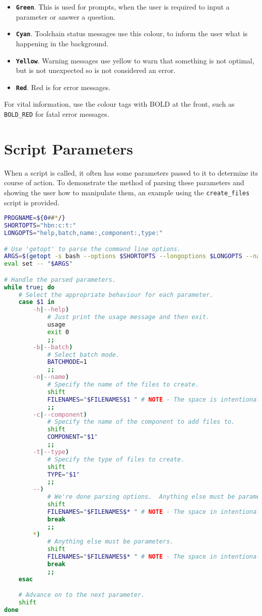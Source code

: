 \documentclass[a4paper, oneside, 11pt, titlepage, onecolumn, openright]{report}
\begin{document}
\begin{itemize}

\item \textbf{\texttt{Green}}. This is used for prompts, when the user is required to input a parameter or answer a question.

\item \textbf{\texttt{Cyan}}. Toolchain status messages use this colour, to inform the user what is happening in the background.

\item \textbf{\texttt{Yellow}}. Warning messages use yellow to warn that something is not optimal, but is not unexpected so is not considered an error.

\item \textbf{\texttt{Red}}. Red is for error messages.

\end{itemize}

			For vital information, use the colour tags with BOLD at the front, such as \texttt{BOLD\_RED} for fatal error messages.

\section{Script Parameters}
			\label{s:ScriptParameters}
			
			When a script is called, it often has some parameters passed to it to determine its course of action. To demonstrate the method of parsing these parameters and showing the user how to manipulate them, an example using the \texttt{create\_files} script is provided.
\begin{lstlisting}[frame=trBL, breaklines=true, language = bash]
PROGNAME=${0##*/} 
SHORTOPTS="hbn:c:t:"
LONGOPTS="help,batch,name:,component:,type:"

# Use 'getopt' to parse the command line options.
ARGS=$(getopt -s bash --options $SHORTOPTS --longoptions $LONGOPTS --name $PROGNAME -- "$@")
eval set -- "$ARGS"

# Handle the parsed parameters.
while true; do
	# Select the appropriate behaviour for each parameter.
	case $1 in
		-h|--help)
			# Just print the usage message and then exit.
			usage
			exit 0
			;;
		-b|--batch)
			# Select batch mode.
			BATCHMODE=1
			;;
		-n|--name)
			# Specify the name of the files to create.
			shift
			FILENAMES="$FILENAMES$1 " # NOTE - The space is intentional!
			;;
		-c|--component)
			# Specify the name of the component to add files to.
			shift
			COMPONENT="$1"
			;;
		-t|--type)
			# Specify the type of files to create.
			shift
			TYPE="$1"
			;;
		--)
			# We're done parsing options.  Anything else must be parameters.
			shift
			FILENAMES="$FILENAMES$* " # NOTE - The space in intentional!
			break
			;;
		*)
			# Anything else must be parameters.
			shift
			FILENAMES="$FILENAMES$* " # NOTE - The space in intentional!
			break
			;;
	esac

	# Advance on to the next parameter.
	shift
done
\end{lstlisting}
\end{document}

